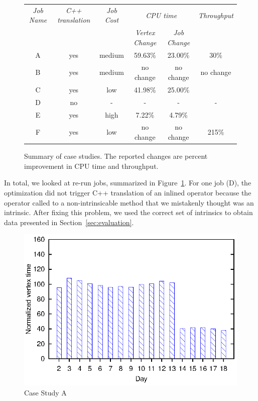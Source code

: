 \begin{figure}[ht]
\begin{tabular}{c|c|c|c|c|c} 
\toprule
  {\em Job Name} & {\em C++ translation}&{\em Job Cost} & \multicolumn{2}{c}{\em CPU time} &  {\em Throughput } \\
  \cmidrule{4-5}  
  & & & {\em Vertex Change} & {\em Job Change} &  \\
  \midrule

A & yes & medium & 59.63\%  & 23.00\% & 30\%\\
B &yes & medium & no change & no change & no change\\
C & yes & low    & 41.98\%  & 25.00\% & \todo{} \\
D & no & - & - & - & -\\
E & yes & high   & 7.22\%   & 4.79\% & \todo{} \\
F & yes & low & no change & no change & 215\%\\

\end{tabular}
\caption{Summary of case studies. The reported changes are percent improvement in CPU time and throughput. \label{fig:caseStudySummary}}
\end{figure}

In total, we looked at \casestudyjobs{} re-run jobs, summarized in Figure~\ref{fig:caseStudySummary}. 
For one job (D), the optimization did not trigger C++ translation of an inlined operator because the operator called to a non-intrinsicable method that we mistakenly thought was an intrinsic.
After fixing this problem, we used the correct set of intrinsics to obtain data presented in Section~\ref{sec:evaluation}.
\begin{figure}[ht]
\includegraphics{graphs/normalizedTimesA}
\caption{Case Study A \label{fig:CaseStudyA}}
\end{figure}

